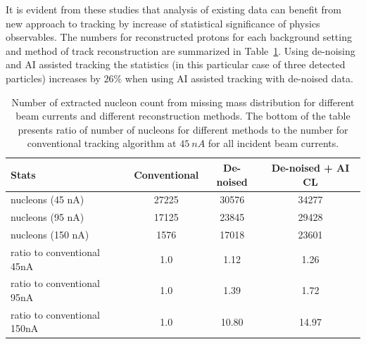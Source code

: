 It is evident from these studies that analysis of existing data can benefit from new approach to tracking by increase 
of statistical significance of physics observables. The numbers for reconstructed protons for each background setting 
and method of track reconstruction are summarized in Table~\ref{table:summary}. Using de-noising and AI assisted 
tracking the statistics (in this particular case of three detected particles) increases by $26\%$ when using AI assisted 
tracking with de-noised data.


\begin{table}
\begin{center}
\begin{tabular}{l|ccc}
Stats & Conventional & De-noised & De-noised + AI CL \\
\hline
 nucleons (45 nA)  & 27225 &  30576 & 34277 \\
 nucleons (95 nA)  & 17125 & 23845 & 29428 \\
 nucleons (150 nA) &  1576 & 17018 & 23601 \\
\hline
\hline
ratio to conventional 45nA & 1.0 & 1.12 & 1.26 \\
ratio to conventional 95nA & 1.0 & 1.39 & 1.72 \\
ratio to conventional 150nA & 1.0 & 10.80 & 14.97 \\
\end{tabular}
\end{center}
\caption{Number of extracted nucleon count from missing mass distribution for different beam currents
and different reconstruction methods. The bottom of the table presents ratio of number of nucleons for
different methods to the number for conventional tracking algorithm at $45~nA$ for all incident beam currents.}
 \label{table:summary}
\end{table}

